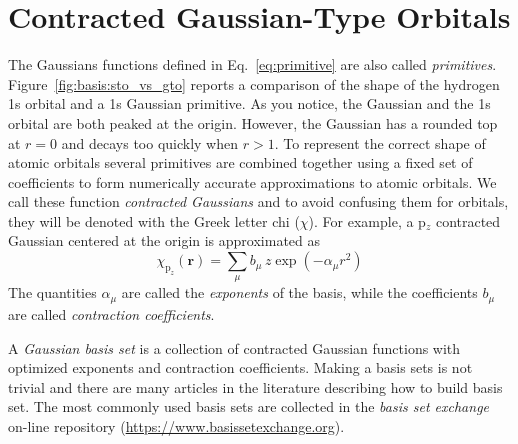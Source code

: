 \documentclass[../Main/chem371-notes.tex]{subfiles}
\begin{document}
\section{Contracted Gaussian-Type Orbitals}
The Gaussians functions defined in Eq.~\eqref{eq:primitive} are also called \emph{primitives}.
Figure~\ref{fig:basis:sto_vs_gto} reports a comparison of the shape of the hydrogen 1s orbital and a 1s Gaussian primitive.
As you notice, the Gaussian and the 1s orbital are both peaked at the origin.
However, the Gaussian has a rounded top at $r = 0$ and decays too quickly when $r > 1$.
To represent the correct shape of atomic orbitals several primitives are combined together using a fixed set of coefficients to form numerically accurate approximations to atomic orbitals.
We call these function \emph{contracted Gaussians} and to avoid confusing them for orbitals, they will be denoted with the Greek letter chi ($\chi$).
For example, a p$_z$ contracted Gaussian centered at the origin is approximated as
\begin{equation}
\chi_{\mathrm{p}_z}(\mathbf{r}) = 
\sum_\mu b_\mu \, z \exp(- \alpha_\mu r^2)
\end{equation}
The quantities $\alpha_\mu$ are called the \emph{exponents} of the basis, while the coefficients $b_\mu$ are called \emph{contraction coefficients}.

A \emph{Gaussian basis set} is a collection of contracted Gaussian functions with optimized exponents and contraction coefficients.
Making a basis sets is not trivial and there are many articles in the literature describing how to build basis set.
The most commonly used basis sets are collected in the \emph{basis set exchange} on-line repository  (\url{https://www.basissetexchange.org}).
\end{document}
